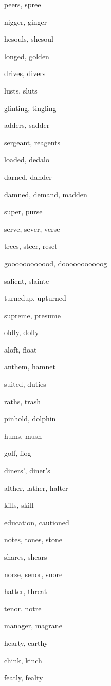     \item peers, spree
    \item nigger, ginger
    \item hesouls, shesoul
    \item longed, golden
    \item drives, divers
    \item lusts, sluts
    \item glinting, tingling
    \item adders, sadder
    \item sergeant, reagents
    \item loaded, dedalo
    \item darned, dander
    \item damned, demand, madden
    \item super, purse
    \item serve, sever, verse
    \item trees, steer, reset
    \item goooooooooood, dooooooooooog
    \item salient, slainte
    \item turnedup, upturned
    \item supreme, presume
    \item oldly, dolly
    \item aloft, float
    \item anthem, hamnet
    \item suited, duties
    \item raths, trash
    \item pinhold, dolphin
    \item hums, mush
    \item golf, flog
    \item diners', diner's
    \item alther, lather, halter
    \item kills, skill
    \item education, cautioned
    \item notes, tones, stone
    \item shares, shears
    \item norse, senor, snore
    \item hatter, threat
    \item tenor, notre
    \item manager, magrane
    \item hearty, earthy
    \item chink, kinch
    \item featly, fealty
